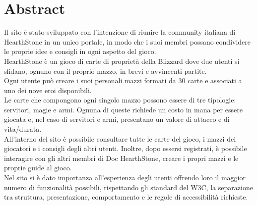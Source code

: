\section{Abstract}
Il sito è stato sviluppato con l'intenzione di riunire la community italiana di HearthStone in un unico portale, in modo che i suoi membri possano condividere le proprie idee e consigli in ogni aspetto del gioco. \\
HearthStone è un gioco di carte di proprietà della Blizzard dove due utenti si sfidano, ognuno con il proprio mazzo, in brevi e avvincenti partite.\\
Ogni utente può creare i suoi personali mazzi formati da 30 carte e associati a uno dei nove eroi disponibili.\\
Le carte che compongono ogni singolo mazzo possono essere di tre tipologie: servitori, magie e armi. Ognuna di queste richiede un costo in mana per essere giocata e, nel caso di servitori e armi, presentano un valore di attacco e di vita/durata.\\
All'interno del sito è possibile consultare tutte le carte del gioco, i mazzi dei giocatori e i consigli degli altri utenti. Inoltre, dopo essersi registrati, è possibile interagire con gli altri membri di Doc HearthStone, creare i propri mazzi e le proprie guide al gioco.\\
Nel sito si è dato importanza all'esperienza degli utenti offrendo loro il maggior numero di funzionalità possibili, rispettando gli standard del W3C, la separazione tra struttura, presentazione, comportamento e le regole di accessibilità richieste.
\newpage